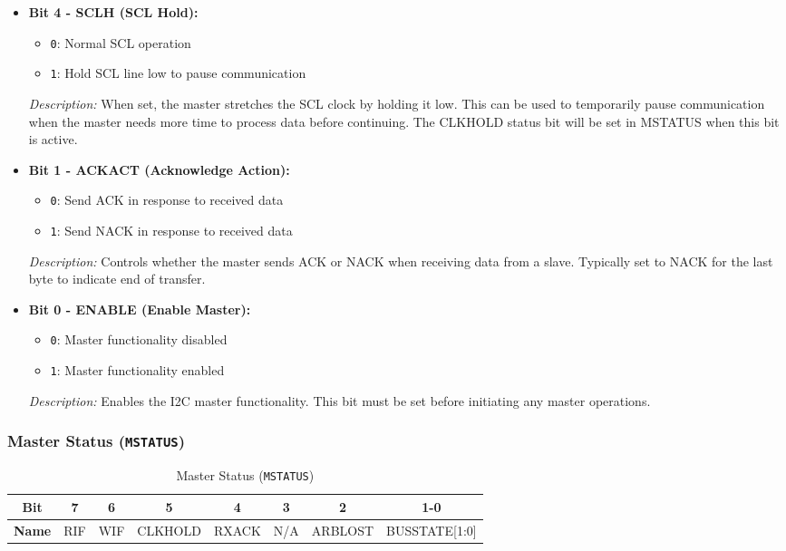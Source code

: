 \begin{itemize}
    \item \textbf{Bit 4 - SCLH (SCL Hold):} 
    \begin{itemize}
        \item \texttt{0}: Normal SCL operation
        \item \texttt{1}: Hold SCL line low to pause communication
    \end{itemize}
    \textit{Description:} When set, the master stretches the SCL clock by holding it low. This can be used to temporarily pause communication when the master needs more time to process data before continuing. The CLKHOLD status bit will be set in MSTATUS when this bit is active.
    
    \item \textbf{Bit 1 - ACKACT (Acknowledge Action):} 
    \begin{itemize}
        \item \texttt{0}: Send ACK in response to received data
        \item \texttt{1}: Send NACK in response to received data
    \end{itemize}
    \textit{Description:} Controls whether the master sends ACK or NACK when receiving data from a slave. Typically set to NACK for the last byte to indicate end of transfer.
    
    \item \textbf{Bit 0 - ENABLE (Enable Master):} 
    \begin{itemize}
        \item \texttt{0}: Master functionality disabled
        \item \texttt{1}: Master functionality enabled
    \end{itemize}
    \textit{Description:} Enables the I2C master functionality. This bit must be set before initiating any master operations.
\end{itemize}

\subsubsection{Master Status (\texttt{MSTATUS})}
\label{sec:mstatus}

\begin{table}[H]
    \centering
    \caption{Master Status (\texttt{MSTATUS})}
    \begin{tabular}{@{}cccccccc@{}}
        \toprule
        \textbf{Bit} & 7 & 6 & 5 & 4 & 3 & 2 & 1-0 \\ \midrule
        \textbf{Name} & RIF & WIF & CLKHOLD & RXACK & N/A & ARBLOST & BUSSTATE[1:0] \\ \bottomrule
    \end{tabular}
    \label{tab:mstatus}
\end{table}

